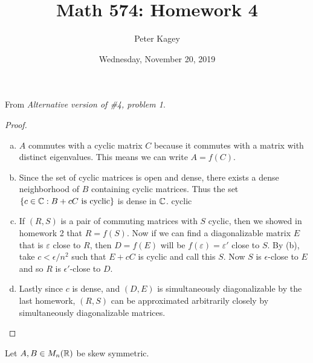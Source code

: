 \documentclass{article}
\begin{document}
\title{Math 574: Homework 4}
\author{Peter Kagey}
\date{Wednesday, November 20, 2019}

\maketitle

\begin{problem}{1}
  From \textit{Alternative version of \#4, problem 1}.
\end{problem}

\begin{proof} ~
  \begin{enumerate}[(a)]
    \item $A$ commutes with a cyclic matrix $C$ because it commutes with a
    matrix with distinct eigenvalues. This means we can write $A = f(C)$.
    \item Since the set of cyclic matrices is open and dense, there exists a
    dense neighborhood of $B$ containing cyclic matrices. Thus the set $\{c \in \mathbb C : B + cC \text{ is cyclic}\}$ is dense in $\mathbb C$.
    cyclic
    \item If $(R, S)$ is a pair of commuting matrices with $S$ cyclic, then we
    showed in homework 2 that $R = f(S)$. Now if we can find a diagonalizable
    matrix $E$ that is $\varepsilon$ close to $R$, then $D = f(E)$ will be $f(\varepsilon) = \varepsilon'$ close to $S$. By (b), take
    $c < \epsilon/n^2$ such that $E + cC$ is cyclic and call this $S$. Now $S$
    is $\epsilon$-close to $E$ and so $R$ is $\epsilon'$-close to $D$.
    \item Lastly since $c$ is dense, and $(D, E)$ is simultaneously
    diagonalizable by the last homework, $(R, S)$ can be approximated
    arbitrarily closely by simultaneously diagonalizable matrices.
  \end{enumerate}
\end{proof}
\begin{problem}{2}
  Let $A, B \in M_n(\mathbb R)$ be skew symmetric.
\end{problem}
\end{document}
